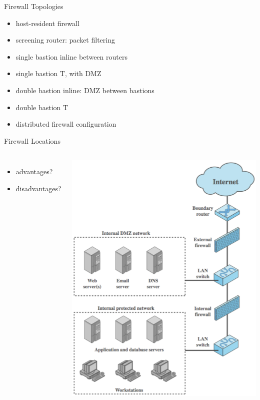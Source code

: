 \documentclass{beamer}
\begin{document}
\begin{frame}{Firewall Topologies}
  \begin{itemize}
  \item host-resident firewall 
  \item screening router: packet filtering 
  \item single bastion inline between routers 
  \item single bastion T, with DMZ 
  \item double bastion inline: DMZ between bastions 
  \item double bastion T 
  \item distributed firewall configuration
  \end{itemize}
\end{frame}

\begin{frame}{Firewall Locations}
  \begin{columns}[c]
     {
    \begin{itemize}
    \item advantages?
    \item disadvantages?
    \end{itemize}
    }
    \includegraphics[width=1\linewidth]{firewall-location}
  \end{columns}
\end{frame}
\end{document}
